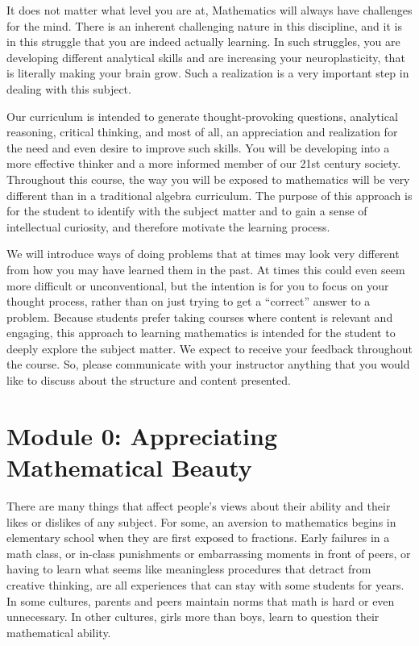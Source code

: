 \documentclass{article}
\begin{document}
It does not matter what level you are at, Mathematics will always have challenges for the mind. There is an inherent challenging nature in this discipline, and it is in this struggle that you are indeed actually learning. In such struggles, you are developing different analytical skills and are increasing your neuroplasticity, that is literally making your brain grow. Such a realization is a very important step in dealing with this subject. 

Our curriculum is intended to generate thought-provoking questions, analytical reasoning, critical thinking, and most of all, an appreciation and realization for the need and even desire to improve such skills. You will be developing into a more effective thinker and a more informed member of our 21st century society.   Throughout this course, the way you will be exposed to mathematics will be very different than in a traditional algebra curriculum.  The purpose of this approach is for the student to identify with the subject matter and to gain a sense of intellectual curiosity, and therefore motivate the learning process.

We will introduce ways of doing problems that at times may look very different from how you may have learned them in the past. At times this could even seem more difficult or unconventional, but the intention is for you to focus on your thought process, rather than on just trying to get a “correct” answer to a problem.  Because students prefer taking courses where content is relevant and engaging, this approach to learning mathematics is intended for the student to deeply explore the subject matter. We expect to receive your feedback throughout the course.  So, please communicate with your instructor anything that you would like to discuss about the structure and content presented.

\section*{Module 0: Appreciating Mathematical Beauty}

There are many things that affect people’s views about their ability and their likes or dislikes of any subject. For some, an aversion to mathematics begins in elementary school when they are first exposed to fractions.  Early failures in a math class, or in-class punishments or embarrassing moments in front of peers, or having to learn what seems like meaningless procedures that detract from creative thinking, are all experiences that can stay with some students for years.  In some cultures, parents and peers maintain norms that math is hard or even unnecessary. In other cultures, girls more than boys, learn to question their mathematical ability. 
\end{document}
